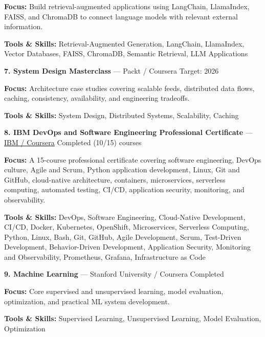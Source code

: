 \documentclass[9pt,letterpaper]{extarticle}
\begin{document}
\textbf{Focus:} Build retrieval-augmented applications using LangChain, LlamaIndex, FAISS, and ChromaDB to connect language models with relevant external information.\par
{\small\textbf{Tools \& Skills:} Retrieval-Augmented Generation, LangChain, LlamaIndex, Vector Databases, FAISS, ChromaDB, Semantic Retrieval, LLM Applications\par}
\vspace{2pt}
\noindent\textbf{7. System Design Masterclass} {\small --- Packt / Coursera \textbar{} Target: 2026}\par
\textbf{Focus:} Architecture case studies covering scalable feeds, distributed data flows, caching, consistency, availability, and engineering tradeoffs.\par
{\small\textbf{Tools \& Skills:} System Design, Distributed Systems, Scalability, Caching\par}
\vspace{2pt}
\noindent\textbf{8. IBM DevOps and Software Engineering Professional Certificate} {\small --- \textcolor{blue}{\underline{\href{https://www.coursera.org/professional-certificates/devops-and-software-engineering}{IBM / Coursera}}} \textbar{} Completed (10/15) courses}\par
\textbf{Focus:} A 15-course professional certificate covering software engineering, DevOps culture, Agile and Scrum, Python application development, Linux, Git and GitHub, cloud-native architecture, containers, microservices, serverless computing, automated testing, CI/CD, application security, monitoring, and observability.\par
{\small\textbf{Tools \& Skills:} DevOps, Software Engineering, Cloud-Native Development, CI/CD, Docker, Kubernetes, OpenShift, Microservices, Serverless Computing, Python, Linux, Bash, Git, GitHub, Agile Development, Scrum, Test-Driven Development, Behavior-Driven Development, Application Security, Monitoring and Observability, Prometheus, Grafana, Infrastructure as Code\par}
\vspace{2pt}
\noindent\textbf{9. Machine Learning} {\small --- Stanford University / Coursera \textbar{} Completed}\par
\textbf{Focus:} Core supervised and unsupervised learning, model evaluation, optimization, and practical ML system development.\par
{\small\textbf{Tools \& Skills:} Supervised Learning, Unsupervised Learning, Model Evaluation, Optimization\par}
\end{document}
